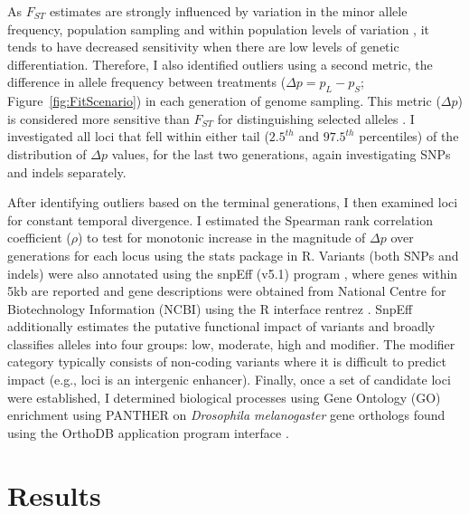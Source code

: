  As $F_{ST}$ estimates are strongly influenced by variation in the minor allele frequency, population sampling and within population levels of variation \citep{Char98}, it tends to have decreased sensitivity when there are low levels of genetic differentiation. Therefore, I also identified outliers using a second metric, the difference in allele frequency between treatments ($\Delta p = p_{L}-p_{S}$; Figure~\ref{fig:FitScenario}) in each generation of genome sampling. This metric ($\Delta p$) is considered more sensitive than $F_{ST}$ for distinguishing selected alleles \cite{Gros10, Bern19}. I investigated all loci that fell within either tail ($2.5^{th}$ and $97.5^{th}$ percentiles) of the distribution of $\Delta p$ values, for the last two generations, again investigating SNPs and indels separately.\par 

After identifying outliers based on the terminal generations, I then examined loci for constant temporal divergence. I estimated the Spearman rank correlation coefficient ($\rho$) to test for monotonic increase in the magnitude of $\Delta p$ over generations for each locus using the stats package in R. Variants (both SNPs and indels) were also annotated using the snpEff (v5.1) program \citep{Cing12}, where genes within 5kb are reported and gene descriptions were obtained from National Centre for Biotechnology Information (NCBI) using the R interface rentrez \citep[v1.2.3,][]{Wint17}. SnpEff additionally estimates the putative functional impact of variants and broadly classifies alleles into four groups: low, moderate, high and modifier. The modifier category typically consists of non-coding variants where it is difficult to predict impact (e.g., loci is an intergenic enhancer). Finally, once a set of candidate loci were established, I determined biological processes using Gene Ontology (GO) enrichment using PANTHER \citep[v17,][]{Thom22} on \textit{Drosophila melanogaster} gene orthologs found using the OrthoDB application program interface \citep{Kuzn22}.\par 

\section{Results}

